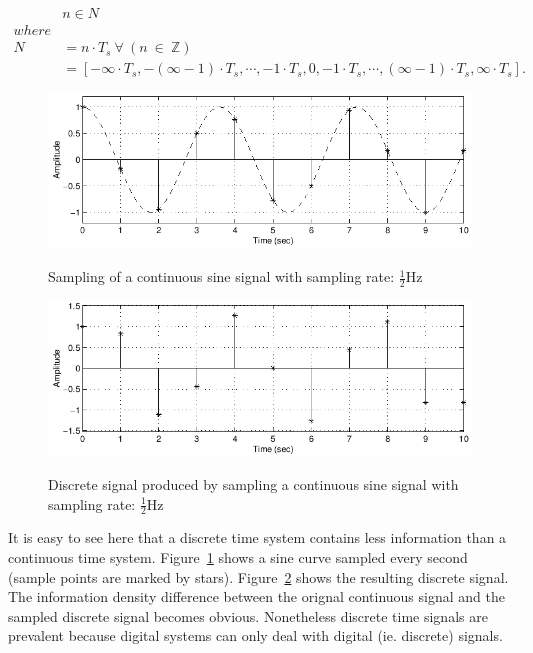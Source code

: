 \begin{align}
&n \in N \nonumber \\
where& \nonumber \\
N &= n\cdot T_s\ \forall\ (n\ \in\ \mathbb{Z}) \nonumber \\
  &= [-\infty \cdot T_s,-(\infty  -1) \cdot T_s,\cdots,-1 \cdot T_s,0,-1 \cdot T_s,\cdots,(\infty-1) \cdot T_s,\infty \cdot T_s]. \nonumber
\end{align}

\begin{figure}
\begin{center}
\includegraphics[width=12cm]{media/disc_sine_cont}\\
\end{center}
\caption{Sampling of a continuous sine signal with sampling rate: $\frac{1}{2}$Hz \cite{jos_sine}}
\label{disc_sine_orig}
\end{figure}

\begin{figure}
\begin{center}
\includegraphics[width=12cm]{media/disc_sine_disc}\\
\end{center}
\caption{Discrete signal produced by sampling a continuous sine signal  with sampling rate: $\frac{1}{2}$Hz \cite{jos_sine}}
\label{disc_sine_disc}
\end{figure}


It is easy to see here that a discrete time system contains less information than a continuous time system. Figure~\ref{disc_sine_orig} shows a sine curve sampled every second (sample points are marked by stars). Figure~\ref{disc_sine_disc} shows the resulting discrete signal. The information density difference between the orignal continuous signal and the sampled discrete signal becomes obvious.  Nonetheless discrete time signals are prevalent because digital systems can only deal with digital (ie. discrete) signals.

